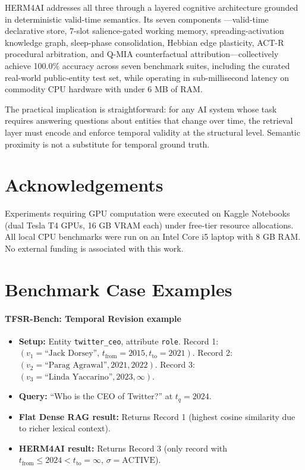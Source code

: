 \documentclass[11pt,a4paper,twocolumn]{article}
\newcommand{\herm}{\textsc{HERM4AI}}
\begin{document}
\herm{} addresses all three through a layered cognitive architecture
grounded in deterministic valid-time semantics.  Its seven components
---valid-time declarative store, 7-slot salience-gated working memory,
spreading-activation knowledge graph, sleep-phase consolidation,
Hebbian edge plasticity, ACT-R procedural arbitration, and Q-MIA
counterfactual attribution---collectively achieve 100.0\% accuracy
across seven benchmark suites, including the curated real-world
public-entity test set,
while operating in sub-millisecond latency on commodity CPU hardware
with under 6 MB of RAM.

The practical implication is straightforward: for any AI system whose
task requires answering questions about entities that change over time,
the retrieval layer must encode and enforce temporal validity at the
structural level.  Semantic proximity is not a substitute for temporal
ground truth.

\section*{Acknowledgements}

Experiments requiring GPU computation were executed on Kaggle Notebooks
(dual Tesla T4 GPUs, 16 GB VRAM each) under free-tier resource
allocations. All local CPU benchmarks were run on an Intel Core i5
laptop with 8 GB RAM. No external funding is associated with this work.

\appendix
\section{Benchmark Case Examples}
\label{sec:appendix}

\paragraph{TFSR-Bench: Temporal Revision example}
\begin{itemize}[leftmargin=*,itemsep=0pt]
  \item \textbf{Setup:} Entity \texttt{twitter\_ceo}, attribute
        \texttt{role}. Record 1: $(v_1 = \text{``Jack Dorsey''},\,
        t_{\text{from}} = 2015, t_{\text{to}} = 2021)$. Record 2:
        $(v_2 = \text{``Parag Agrawal''}, 2021, 2022)$.  Record 3:
        $(v_3 = \text{``Linda Yaccarino''}, 2023, \infty)$.
  \item \textbf{Query:} ``Who is the CEO of Twitter?'' at $t_q = 2024$.
  \item \textbf{Flat Dense RAG result:} Returns Record 1 (highest
        cosine similarity due to richer lexical context).
  \item \textbf{\herm{} result:} Returns Record 3 (only record with
        $t_{\text{from}} \le 2024 < t_{\text{to}} = \infty$,
        $\sigma = \text{ACTIVE}$).
\end{itemize}
\end{document}
